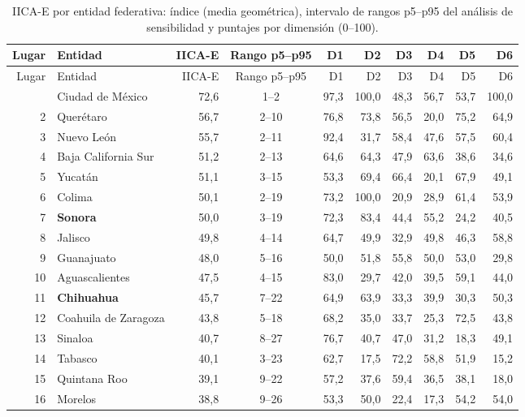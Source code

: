 {\scriptsize
\begin{longtable}{@{}rp{4.2cm}rcrrrrrr@{}}
\caption{IICA-E por entidad federativa: índice (media geométrica), intervalo de rangos p5--p95 del análisis de sensibilidad y puntajes por dimensión (0--100).}\label{tab:entidades}\\
\toprule
Lugar & Entidad & IICA-E & Rango p5--p95 & D1 & D2 & D3 & D4 & D5 & D6\\
\midrule
\endfirsthead
\toprule
Lugar & Entidad & IICA-E & Rango p5--p95 & D1 & D2 & D3 & D4 & D5 & D6\\
\midrule
\endhead
\bottomrule
\endfoot
1 & Ciudad de México & 72{,}6 & 1--2 & 97{,}3 & 100{,}0 & 48{,}3 & 56{,}7 & 53{,}7 & 100{,}0\\
2 & Querétaro & 56{,}7 & 2--10 & 76{,}8 & 73{,}8 & 56{,}5 & 20{,}0 & 75{,}2 & 64{,}9\\
3 & Nuevo León & 55{,}7 & 2--11 & 92{,}4 & 31{,}7 & 58{,}4 & 47{,}6 & 57{,}5 & 60{,}4\\
4 & Baja California Sur & 51{,}2 & 2--13 & 64{,}6 & 64{,}3 & 47{,}9 & 63{,}6 & 38{,}6 & 34{,}6\\
5 & Yucatán & 51{,}1 & 3--15 & 53{,}3 & 69{,}4 & 66{,}4 & 20{,}1 & 67{,}9 & 49{,}1\\
6 & Colima & 50{,}1 & 2--19 & 73{,}2 & 100{,}0 & 20{,}9 & 28{,}9 & 61{,}4 & 53{,}9\\
7 & \textbf{Sonora} & 50{,}0 & 3--19 & 72{,}3 & 83{,}4 & 44{,}4 & 55{,}2 & 24{,}2 & 40{,}5\\
8 & Jalisco & 49{,}8 & 4--14 & 64{,}7 & 49{,}9 & 32{,}9 & 49{,}8 & 46{,}3 & 58{,}8\\
9 & Guanajuato & 48{,}0 & 5--16 & 50{,}0 & 51{,}8 & 55{,}8 & 50{,}0 & 53{,}0 & 29{,}8\\
10 & Aguascalientes & 47{,}5 & 4--15 & 83{,}0 & 29{,}7 & 42{,}0 & 39{,}5 & 59{,}1 & 44{,}0\\
11 & \textbf{Chihuahua} & 45{,}7 & 7--22 & 64{,}9 & 63{,}9 & 33{,}3 & 39{,}9 & 30{,}3 & 50{,}3\\
12 & Coahuila de Zaragoza & 43{,}8 & 5--18 & 68{,}2 & 35{,}0 & 33{,}7 & 25{,}3 & 72{,}5 & 43{,}8\\
13 & Sinaloa & 40{,}7 & 8--27 & 76{,}7 & 40{,}7 & 47{,}0 & 31{,}2 & 18{,}3 & 49{,}1\\
14 & Tabasco & 40{,}1 & 3--23 & 62{,}7 & 17{,}5 & 72{,}2 & 58{,}8 & 51{,}9 & 15{,}2\\
15 & Quintana Roo & 39{,}1 & 9--22 & 57{,}2 & 37{,}6 & 59{,}4 & 36{,}5 & 38{,}1 & 18{,}0\\
16 & Morelos & 38{,}8 & 9--26 & 53{,}3 & 50{,}0 & 22{,}4 & 17{,}3 & 54{,}2 & 54{,}0\\

\end{longtable}}
